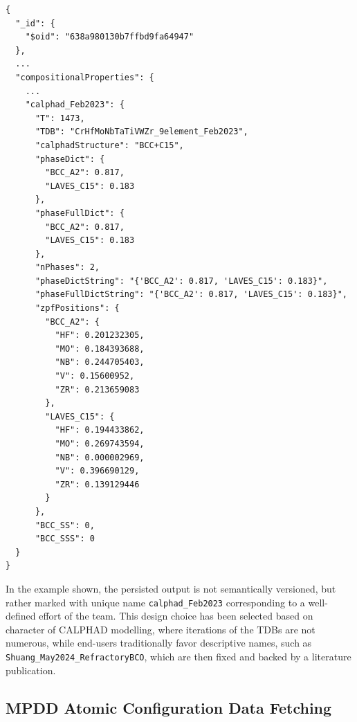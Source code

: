 \begin{verbatim}
{
  "_id": {
    "$oid": "638a980130b7ffbd9fa64947"
  },
  ...
  "compositionalProperties": {
    ...
    "calphad_Feb2023": {
      "T": 1473,
      "TDB": "CrHfMoNbTaTiVWZr_9element_Feb2023",
      "calphadStructure": "BCC+C15",
      "phaseDict": {
        "BCC_A2": 0.817,
        "LAVES_C15": 0.183
      },
      "phaseFullDict": {
        "BCC_A2": 0.817,
        "LAVES_C15": 0.183
      },
      "nPhases": 2,
      "phaseDictString": "{'BCC_A2': 0.817, 'LAVES_C15': 0.183}",
      "phaseFullDictString": "{'BCC_A2': 0.817, 'LAVES_C15': 0.183}",
      "zpfPositions": {
        "BCC_A2": {
          "HF": 0.201232305,
          "MO": 0.184393688,
          "NB": 0.244705403,
          "V": 0.15600952,
          "ZR": 0.213659083
        },
        "LAVES_C15": {
          "HF": 0.194433862,
          "MO": 0.269743594,
          "NB": 0.000002969,
          "V": 0.396690129,
          "ZR": 0.139129446
        }
      },
      "BCC_SS": 0,
      "BCC_SSS": 0
  }
}
\end{verbatim}

In the example shown, the persisted output is not semantically versioned, but rather marked with unique name \texttt{calphad\_Feb2023} corresponding to a well-defined effort of the team. This design choice has been selected based on character of CALPHAD modelling, where iterations of the TDBs are not numerous, while end-users traditionally favor descriptive names, such as \texttt{Shuang\_May2024\_RefractoryBCO}, which are then fixed and backed by a literature publication.


\subsection{MPDD Atomic Configuration Data Fetching} \label{ultera:ssec:mpdd}

\todo


